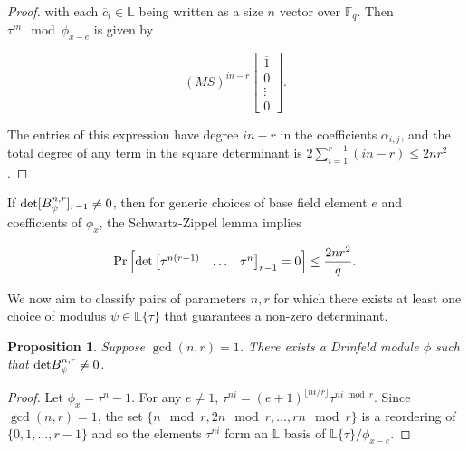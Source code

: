 \documentclass[sigconf]{acmart}
\newtheorem{prop}{Proposition}
\renewcommand{\L}{\mathbb{L}}
\newcommand{\sring}{\L\{\tau\}}
\begin{document}
\begin{proof}
with each $\overline{c}_i \in \L$ being written as a size $n$ vector over $\mathbb{F}_q$. Then $\tau^{in} \mod \phi_{x-e}$ is given by 

\begin{equation*}
(MS)^{in-r} \begin{bmatrix} \overline{1} \\ 0 \\ \vdots \\ 0 \end{bmatrix}.
\end{equation*}

The entries of this expression have degree $in - r$ in the coefficients $\alpha_{i,j}$, and the total degree of any term in the square determinant is $2\sum_{i=1}^{r-1} (in - r) \leq 2nr^2$.

\end{proof}

If $\textnormal{det} [B_{\psi}^{n,r}]_{r-1} \neq 0 $, then for generic choices of base field element $e$ and coefficients of $\phi_x$, the Schwartz-Zippel lemma implies


\begin{equation*}
    \Pr\Big[\textnormal{det} \begin{bmatrix} \tau^{n(r-1)} & \ldots & \tau^{n} \end{bmatrix}_{r-1} = 0\Big] \leq \frac{2nr^2}{q}.
\end{equation*}

We now aim to classify pairs of parameters $n,r$ for which there exists at least one choice of modulus $\psi \in \sring$ that guarantees a non-zero determinant. 

\begin{prop}
Suppose $\gcd(n,r) = 1$. There exists a Drinfeld module $\phi$ such that $\textnormal{det} B_{\psi}^{n,r} \neq 0$.  %
\end{prop}
\begin{proof}
Let $\phi_x = \tau^n - 1$. For any $e \neq 1$, $\tau^{ni} = (e + 1)^{\lfloor ni/r \rfloor} \tau^{ni \bmod r}$. Since $\gcd(n,r) = 1$, the set $\{ n \mod r, 2n \mod r, \ldots, rn \mod r\}$ is a reordering of $\{0, 1, \ldots, r-1\}$ and so the elements $\tau^{ni}$ form an $\L$ basis of $\L\{ \tau\}/\phi_{x - e}$.
\end{proof}
\end{document}
